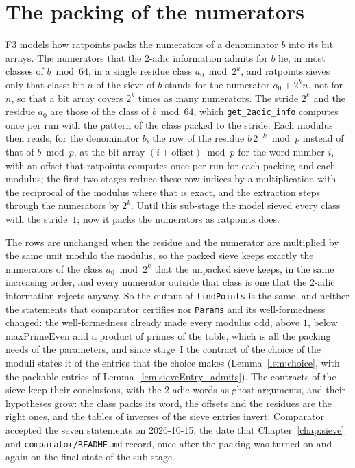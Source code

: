 \chapter{The packing of the numerators}\label{chap:packing}

F3 models how ratpoints packs the numerators of a denominator $b$ into its bit arrays. The
numerators that the 2-adic information admits for $b$ lie, in most classes of $b \bmod 64$, in a
single residue class $a_0 \bmod 2^k$, and ratpoints sieves only that class: bit $n$ of the sieve of
$b$ stands for the numerator $a_0 + 2^k n$, not for $n$, so that a bit array covers $2^k$ times as
many numerators. The stride $2^k$ and the residue $a_0$ are those of the class of $b \bmod 64$,
which \verb|get_2adic_info| computes once per run with the pattern of the class packed to the
stride. Each modulus then reads, for the denominator $b$, the row of the residue
$b\, 2^{-k} \bmod p$ instead of that of $b \bmod p$, at the bit array
$(i + \mathrm{offset}) \bmod p$ for the word number $i$, with an offset that ratpoints computes once
per run for each packing and each modulus; the first two stages reduce these row indices by a
multiplication with the reciprocal of the modulus where that is exact, and the extraction steps
through the numerators by $2^k$. Until this sub-stage the model sieved every class with the
stride~$1$; now it packs the numerators as ratpoints does.

The rows are unchanged when the residue and the numerator are multiplied by the same unit modulo the
modulus, so the packed sieve keeps exactly the numerators of the class $a_0 \bmod 2^k$ that the
unpacked sieve keeps, in the same increasing order, and every numerator outside that class is one
that the 2-adic information rejects anyway. So the output of \verb|findPoints| is the same, and
neither the statements that comparator certifies nor \verb|Params| and its well-formedness changed:
the well-formedness already made every modulus odd, above $1$, below $\mathrm{maxPrimeEven}$ and a
product of primes of the table, which is all the packing needs of the parameters, and since stage~I
the contract of the choice of the moduli states it of the entries that the choice makes
(Lemma~\ref{lem:choice}, with the packable entries of Lemma~\ref{lem:sieveEntry_admits}). The
contracts of the sieve keep their conclusions, with the 2-adic words as ghost arguments, and their
hypotheses grow: the class packs its word, the offsets and the residues are the right ones, and the
tables of inverses of the sieve entries invert. Comparator accepted the seven statements on
2026-10-15, the date that Chapter~\ref{chap:sieve} and \verb|comparator/README.md| record, once
after the packing was turned on and again on the final state of the sub-stage.

